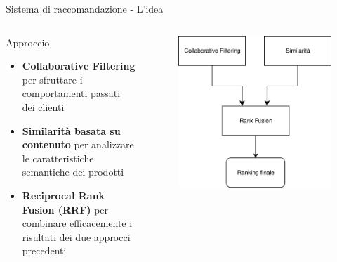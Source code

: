\documentclass{beamer}
\begin{document}
\begin{frame}{Sistema di raccomandazione - L'idea}
		\begin{columns}
			\begin{column}{0.6\textwidth}
				\begin{exampleblock}{Approccio}
					\begin{itemize}
						\item \textbf{Collaborative Filtering} per sfruttare i comportamenti passati dei clienti
						\item \textbf{Similarità basata su contenuto} per analizzare le caratteristiche semantiche dei prodotti
						\item \textbf{Reciprocal Rank Fusion (RRF)} per combinare efficacemente i risultati dei due approcci precedenti
					\end{itemize}
				\end{exampleblock}
			\end{column}
			\begin{column}{0.4\textwidth}
				\begin{figure}
					\centering
					\includegraphics[width=\textwidth]{Diagramma pipeline sistema di raccomandazione.png}
				\end{figure}
			\end{column}
		\end{columns}
	\end{frame}
\end{document}
